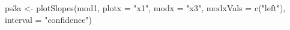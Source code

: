 \begin{Schunk}
\begin{Sinput}
 ps3a <- plotSlopes(mod1, plotx = "x1", modx = "x3", modxVals = c("left"), interval = "confidence")
\end{Sinput}
\end{Schunk}
